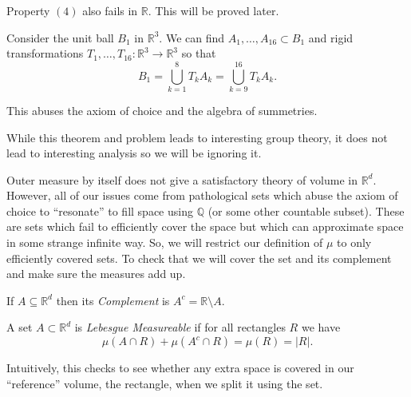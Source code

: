 \documentclass{amsart}
\theoremstyle{definition}
\numberwithin{equation}{section}
\newcommand{\sm}{\setminus}
\newcommand{\susbet}{\subset}
\newcommand{\R}{\mathbb{R}}
\newcommand{\Q}{\mathbb{Q}}
\begin{document}
  \begin{theorem}

    Property $(4)$ also fails in $\R.$ This will be proved later.

  \end{theorem}

  \begin{theorem}

    Consider the unit ball $B_1$ in $\R^3.$ We can find $A_1, \ldots, A_{16} \susbet B_1$ and rigid transformations $T_1, \ldots, T_{16}:\R^3 \to \R^3$ so that
    \[B_1 = \bigcup_{k=1}^8T_kA_k = \bigcup_{k=9}^{16}T_kA_k.\]

    This abuses the axiom of choice and the algebra of summetries.

  \end{theorem}

  \begin{history}

    While this theorem and problem leads to interesting group theory, it does not lead to interesting analysis so we will be ignoring it.

  \end{history}

  \begin{remark}

    Outer measure by itself does not give a satisfactory theory of volume in $\R^d.$ However, all of our issues come from pathological sets which abuse the axiom of choice to ``resonate'' to fill space using $\Q$ (or some other countable subset). These are sets which fail to efficiently cover the space but which can approximate space in some strange infinite way. So, we will restrict our definition of $\mu$ to only efficiently covered sets. To check that we will cover the set and its complement and make sure the measures add up.

  \end{remark}

  \begin{definition}

    If $A \subseteq \R^d$ then its \emph{Complement} is $A^c = \R \sm A.$

  \end{definition}

  \begin{definition}

    A set $A \subset \R^d$ is \emph{Lebesgue Measureable} if for all rectangles $R$ we have
    \[\mu(A \cap R) + \mu(A^c \cap R) = \mu(R) = |R|.\]

    Intuitively, this checks to see whether any extra space is covered in our ``reference'' volume, the rectangle, when we split it using the set.

  \end{definition}
\end{document}
